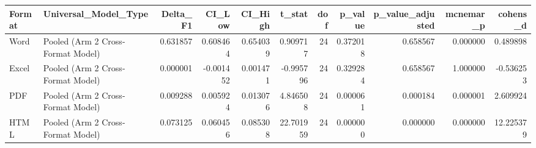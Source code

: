 \begin{tabular}{llrrrrrrrrr}
\toprule
Format & Universal_Model_Type & Delta_F1 & CI_Low & CI_High & t_stat & dof & p_value & p_value_adjusted & mcnemar_p & cohens_d \\
\midrule
Word & Pooled (Arm 2 Cross-Format Model) & 0.631857 & 0.608464 & 0.654039 & 0.909717 & 24 & 0.372018 & 0.658567 & 0.000000 & 0.489898 \\
Excel & Pooled (Arm 2 Cross-Format Model) & 0.000001 & -0.001452 & 0.001471 & -0.995796 & 24 & 0.329284 & 0.658567 & 1.000000 & -0.536253 \\
PDF & Pooled (Arm 2 Cross-Format Model) & 0.009288 & 0.005924 & 0.013076 & 4.846508 & 24 & 0.000061 & 0.000184 & 0.000001 & 2.609924 \\
HTML & Pooled (Arm 2 Cross-Format Model) & 0.073125 & 0.060456 & 0.085308 & 22.701959 & 24 & 0.000000 & 0.000000 & 0.000000 & 12.225379 \\
\bottomrule
\end{tabular}
